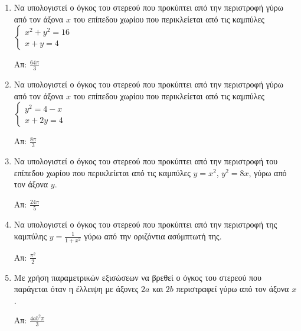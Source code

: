 


\everymath{\displaystyle}
\thispagestyle{empty}



\begin{center}
\end{center}

\vspace{\baselineskip}



\begin{enumerate}

\item Να υπολογιστεί ο όγκος του στερεού που προκύπτει από την περιστροφή γύρω
	από τον άξονα $x$ του επίπεδου χωρίου που περικλείεται από τις καμπύλες 
$				\begin{cases}
	x^{2} + y^{2} = 16 \\
		x+y=4
	\end{cases}$

\hfill Απ: $ \frac{64 \pi}{3} $

\item Να υπολογιστεί ο όγκος του στερεού που προκύπτει από την περιστροφή γύρω
	από τον άξονα $x$ του επίπεδου χωρίου που περικλείεται από τις καμπύλες 
$\begin{cases}
		y^{2} = 4-x \\
		x+2y=4
\end{cases}$

\hfill Απ: $ \frac{8 \pi}{3} $

\item Να υπολογιστεί ο όγκος του στερεού που προκύπτει από την περιστροφή του
	επίπεδου χωρίου που περικλείεται από τις καμπύλες $ y=x^{2} $, $ y^{2}=8x $,
	γύρω από τον άξονα $y$.

	\hfill Απ: $ \frac{24 \pi}{5} $

\item Να υπολογιστεί ο όγκος του στερεού που προκύπτει από την περιστροφή της
	καμπύλης $ y = \frac{1}{1+x^{2}} $ γύρω από την οριζόντια ασύμπτωτή της. 

	\hfill Απ: $ \frac{\pi ^{2}}{2} $


\item Με χρήση παραμετρικών εξισώσεων να βρεθεί ο όγκος του στερεού που παράγεται όταν η
	έλλειψη με άξονες $2a$ και $2b$ περιστραφεί γύρω από τον άξονα $x$.

	\hfill Απ: $ \frac{4ab^{2} \pi}{3} $
	


\end{enumerate}
